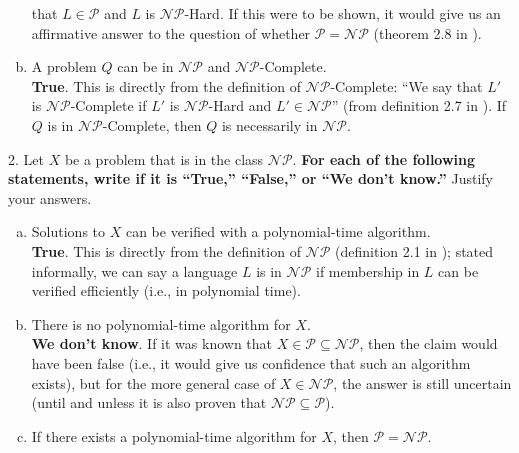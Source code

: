 \documentclass{scrartcl}
\begin{document}
\begin{flushleft}
\begin{enumerate}[(a)]
            that $L \in \mathcal{P}$ and $L$ is $\mathcal{NP}$-Hard. If this were to be shown, it
            would give us an affirmative answer to the question of whether $\mathcal{P} =
            \mathcal{NP}$ (theorem 2.8 in \cite{modernapp}).
        \item A problem $Q$ can be in $\mathcal{NP}$ and $\mathcal{NP}$-Complete.\\
            \bigskip
            \textbf{True}. This is directly from the definition of $\mathcal{NP}$-Complete: ``We say
            that $L'$ is $\mathcal{NP}$-Complete if $L'$ is $\mathcal{NP}$-Hard and $L' \in
            \mathcal{NP}$'' (from definition 2.7 in \cite{modernapp}). If $Q$ is in
            $\mathcal{NP}$-Complete, then $Q$ is necessarily in $\mathcal{NP}$.
    \end{enumerate}
    2. Let $X$ be a problem that is in the class $\mathcal{NP}$. \textbf{For each of the following
    statements, write if it is ``True,'' ``False,'' or ``We don't know.''} Justify your answers.\\
    \begin{enumerate}[(a)]
        \item Solutions to $X$ can be verified with a polynomial-time algorithm.\\
            \bigskip
            \textbf{True}. This is directly from the definition of $\mathcal{NP}$ (definition 2.1 in
            \cite{modernapp}); stated informally, we can say a language $L$ is in $\mathcal{NP}$ if
            membership in $L$ can be verified efficiently (i.e., in polynomial time).
        \item There is no polynomial-time algorithm for $X$.\\
            \bigskip
            \textbf{We don't know}. If it was known that $X \in \mathcal{P} \subseteq \mathcal{NP}$,
            then the claim would have been false (i.e., it would give us confidence that such an
            algorithm exists), but for the more general case of $X \in \mathcal{NP}$, the answer is
            still uncertain (until and unless it is also proven that $\mathcal{NP} \subseteq
            \mathcal{P}$).
        \item If there exists a polynomial-time algorithm for $X$, then $\mathcal{P} =
            \mathcal{NP}$.\\

\end{enumerate}
\end{flushleft}
\end{document}
